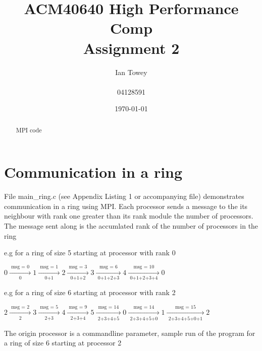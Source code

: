 \documentclass[a4paper]{article}
\title{ACM40640 High Performance Comp \\ Assignment 2}
\author{Ian Towey \\ \\ 04128591}
\date{\today}
\begin{document}
  \maketitle

  \begin{abstract}
    MPI code
  \end{abstract}

\tableofcontents

\newpage
\section{Communication in a ring}

File main\_ring.c (see Appendix Listing 1 or accompanying file) demonstrates communication in a ring using MPI.
Each processor sends a message to the its neighbour with rank one greater than its rank module the number of processors.
The message sent along is the accumlated rank of the number of processors in the ring

e.g for a ring of size 5 starting at processor with rank 0
\begin{center}
 $0  \xrightarrow[\text{     0     }]{\text{     msg = 0     }} 1 \xrightarrow[\text{     0+1     }]{\text{     msg = 1     }} 2 \xrightarrow[\text{     0+1+2     }]{\text{     msg = 3     }} 3 \xrightarrow[\text{     0+1+2+3     }]{\text{     msg = 6     }} 4 \xrightarrow[\text{     0+1+2+3+4     }]{\text{     msg = 10     }} 0$
\end{center}


e.g for a ring of size 6 starting at processor with rank 2
\begin{center}
 $2  \xrightarrow[\text{     2     }]{\text{     msg = 2     }} 3 \xrightarrow[\text{     2+3     }]{\text{     msg = 5     }} 4 \xrightarrow[\text{     2+3+4     }]{\text{     msg = 9     }} 5 \xrightarrow[\text{     2+3+4+5     }]{\text{     msg = 14     }} 0 \xrightarrow[\text{     2+3+4+5+0     }]{\text{     msg = 14     }} 1 \xrightarrow[\text{     2+3+4+5+0+1     }]{\text{     msg = 15     }} 2$
\end{center}

The origin processor is a commandline parameter, sample run of the program for a ring of size 6 starting at processor 2
\end{document}
